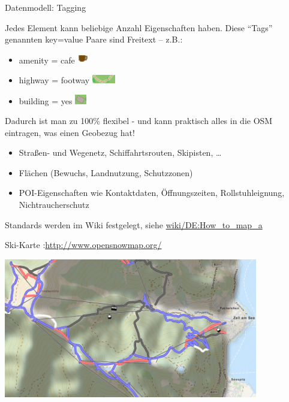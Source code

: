 \documentclass{beamer}
\begin{document}
\begin{frame}{Datenmodell: Tagging}

Jedes Element kann beliebige Anzahl Eigenschaften haben. 
Diese "`Tags"' genannten key=value Paare sind Freitext -- z.B.:
\begin{itemize}
  \item amenity = cafe \includegraphics[width=0.5cm]{cafe.png}
  \item highway = footway \includegraphics[width=1cm]{footway.png}
  \item building = yes  \includegraphics[width=0.5cm]{building.png}
\end{itemize}

\pause
Dadurch ist man zu 100\% flexibel - und kann praktisch alles in die OSM eintragen, was einen Geobezug hat!

\begin{itemize}
  \item Straßen- und Wegenetz, Schiffahrtsrouten, Skipisten, \dots
  \item Flächen (Bewuchs, Landnutzung, Schutzzonen)
  \item POI-Eigenschaften wie Kontaktdaten, Öffnungszeiten, Rollstuhleignung, Nichtraucherschutz
\end{itemize}

Standards werden im Wiki festgelegt, siehe \href{http://wiki.openstreetmap.org/wiki/DE:How\_to\_map\_a}{wiki/DE:How\_to\_map\_a}

\end{frame}


\hypersetup{urlcolor=cyan}

\begin{frame}{Ski-Karte :\hfill\url{http://www.opensnowmap.org/}}
\begin{center}
\includegraphics[height=6.1cm]{style-snow.png}
\end{center}
\end{frame}
\end{document}
